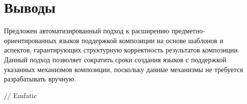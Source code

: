 \chapter{Выводы}

Предложен автоматизированный подход к расширению предметно-ориентированных языков поддержкой композиции на основе шаблонов и аспектов, гарантирующих структурную корректность результатов композиции. Данный подход позволяет сократить сроки создания языков с поддержкой указанных механизмов композиции, поскольку данные механизмы не требуется разрабатывать вручную.

// Emfatic